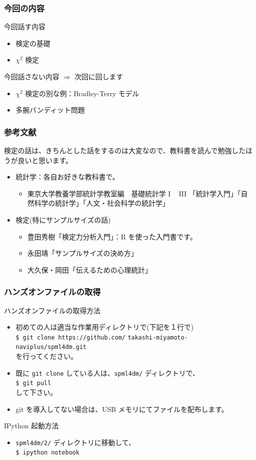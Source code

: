 \documentclass{beamer}
\begin{document}
\begin{frame}
  \frametitle{今回の内容}
  今回話す内容
  \begin{itemize}
    \item 検定の基礎
    \item $\chi^2$ 検定
  \end{itemize}
  今回話さない内容 $\Rightarrow$ 次回に回します
  \begin{itemize}
    \item $\chi^2$ 検定の別な例：Bradley-Terry モデル
    \item 多腕バンディット問題
  \end{itemize}
\end{frame}
\begin{frame}
  \frametitle{参考文献}
  検定の話は、きちんとした話をするのは大変なので、教科書を読んで勉強したほうが良いと思います。\\
  \begin{itemize}
    \item 統計学：各自お好きな教科書で。
    \begin{itemize} 
      \item 東京大学教養学部統計学教室編　基礎統計学 I ~ III 「統計学入門」「自然科学の統計学」「人文・社会科学の統計学」
    \end{itemize}  
    \item 検定(特にサンプルサイズの話)
    \begin{itemize}
      \item 豊田秀樹「検定力分析入門」：R を使った入門書です。
      \item 永田靖「サンプルサイズの決め方」
      \item 大久保・岡田「伝えるための心理統計」
    \end{itemize}
  \end{itemize}
\end{frame}
\begin{frame}[fragile]
  \frametitle{ハンズオンファイルの取得}
  ハンズオンファイルの取得方法
  \begin{itemize}
    \item 初めての人は適当な作業用ディレクトリで(下記を１行で) \\ \texttt{\$ git clone https://github.com/} \texttt{takashi-miyamoto-naviplus/spml4dm.git} \\を行ってください。
    \item 既に \texttt{git clone} している人は、\texttt{spml4dm/} ディレクトリで、\\ \texttt{\$ git pull} \\ して下さい。
    \item git を導入してない場合は、USB メモリにてファイルを配布します。
  \end{itemize}
  IPython 起動方法
  \begin{itemize}
    \item \texttt{spml4dm/2/} ディレクトリに移動して、\\
    \texttt{\$ ipython notebook}
  \end{itemize}
\end{frame}
\end{document}
